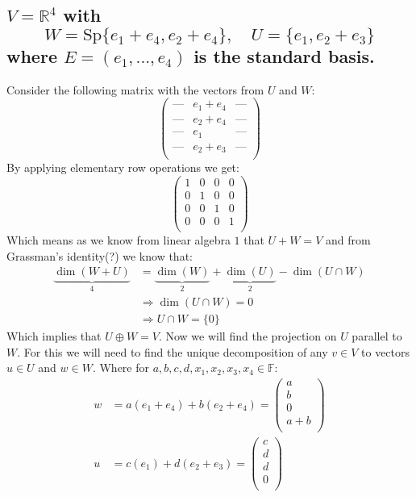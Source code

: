 \documentclass[11pt,a4paper]{article}
\theoremstyle{plain}
\newcommand{\R}{\mathbb{R}}
\newcommand{\F}{\mathbb{F}}
\begin{document}
	\subsection{$V = \R^4$ with 
	\[ W = \text{Sp}\{e_1+e_4,e_2+e_4\},\quad U = \{e_1,e_2+e_3\} \] 
	where $E = (e_1,...,e_4)$ is the standard basis.}
	Consider the following matrix with the vectors from $U$ and $W$:
	\[ \begin{pmatrix}
	\text{---} & e_1+e_4 & \text{---}\\
	\text{---} & e_2+e_4 & \text{---}\\
	\text{---} & e_1 & \text{---}\\
	\text{---} & e_2+e_3 & \text{---}\\
	\end{pmatrix} \]
	By applying elementary row operations we get:
	\[ \begin{pmatrix}
	1 & 0 & 0 & 0\\
	0 & 1 & 0 & 0\\
	0 & 0 & 1 & 0\\
	0 & 0 & 0 & 1\\
	\end{pmatrix} \]
	Which means as we know from linear algebra $1$ that $U + W = V$ and from
	Grassman's identity(?) we know that:
	\begin{align*}
		\underbrace{\dim(W+U)}_4 &= \underbrace{\dim(W)}_2
		+ \underbrace{\dim(U)}_2 - \dim(U\cap W) \\
		&\Rightarrow \dim(U\cap W) = 0 \\
		&\Rightarrow U\cap W = \{0\}
	\end{align*}
	Which implies that $U\oplus W = V$. Now we will find the projection on 
	$U$ parallel to $W$. For this we will need to find the unique decomposition
	of any $v\in V$ to vectors $u\in U$ and $w\in W$. Where for 
	$a,b,c,d,x_1,x_2,x_3,x_4\in\F$:
	\begin{align*}
		w &= a(e_1+e_4) + b(e_2+e_4) = 
		\begin{pmatrix}
	a\\
	b\\
	0\\
	a+b\\
		\end{pmatrix} \\
		u &= c(e_1) + d(e_2+e_3) = 
		\begin{pmatrix}
	c\\
	d\\
	d\\
	0\\
		\end{pmatrix} \\
	\end{align*}
\end{document}

